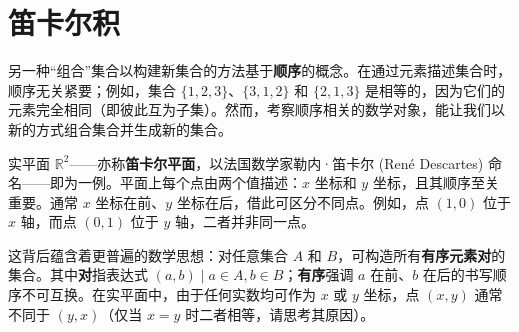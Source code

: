 \section{笛卡尔积}

另一种``组合''集合以构建新集合的方法基于\textbf{顺序}的概念。在通过元素描述集合时，顺序无关紧要；例如，集合 $\{1, 2, 3\}$、$\{3, 1, 2\}$ 和 $\{2, 1, 3\}$ 是相等的，因为它们的元素完全相同（即彼此互为子集）。然而，考察顺序相关的数学对象，能让我们以新的方式组合集合并生成新的集合。

实平面 $\mathbb{R}^2$——亦称\textbf{笛卡尔平面}，以法国数学家勒内·笛卡尔 (René Descartes) 命名——即为一例。平面上每个点由两个值描述：$x$ 坐标和 $y$ 坐标，且其顺序至关重要。通常 $x$ 坐标在前、$y$ 坐标在后，借此可区分不同点。例如，点 $(1, 0)$ 位于 $x$ 轴，而点 $(0, 1)$ 位于 $y$ 轴，二者并非同一点。

这背后蕴含着更普遍的数学思想：对任意集合 $A$ 和 $B$，可构造所有\textbf{有序元素对}的集合。其中\textbf{对}指表达式 $(a, b) \mid a \in A, b \in B$；\textbf{有序}强调 $a$ 在前、$b$ 在后的书写顺序不可互换。在实平面中，由于任何实数均可作为 $x$ 或 $y$ 坐标，点 $(x, y)$ 通常不同于 $(y, x)$（仅当 $x=y$ 时二者相等，请思考其原因）。





